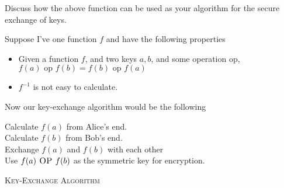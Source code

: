 \documentclass[12pt, a4paper, onecolumn]{exam}
\begin{document}
\begin{questions}
\begin{solution}
    \end{solution}

    \question Discuss how the above function can be used as your algorithm for the secure exchange of keys.

    \begin{solution}
        Suppose I've one function $f$ and have the following properties
        
        \begin{itemize}
            \item Given a function $f$, and two keys $a, b$, and some operation
            $\text{op}$, $f(a) \text{ op } f(b) = f(b) \text{ op } f(a)$
            \item $f^{-1}$ is not easy to calculate.
        \end{itemize}

        Now our key-exchange algorithm would be the following

        \begin{algorithm}[H]
            
            \BlankLine
            Calculate $f(a)$ from Alice's end.\\
            Calculate $f(b)$ from Bob's end.\\
            Exchange $f(a)$ and $f(b)$ with each other\\
            Use $f(a) \textsc{ OP } f(b)$ as the symmetric key for encryption.
            \caption{\textsc{Key-Exchange Algorithm}}
        \end{algorithm}
        
    \end{solution}
\end{questions}
\end{document}
